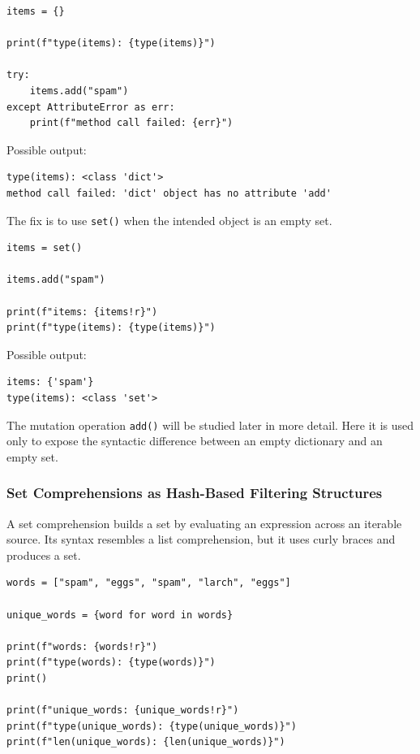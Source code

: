 \begin{verbatim}
items = {}

print(f"type(items): {type(items)}")

try:
    items.add("spam")
except AttributeError as err:
    print(f"method call failed: {err}")
\end{verbatim}

Possible output:

\begin{verbatim}
type(items): <class 'dict'>
method call failed: 'dict' object has no attribute 'add'
\end{verbatim}

The fix is to use \texttt{set()} when the intended object is an empty set.

\begin{verbatim}
items = set()

items.add("spam")

print(f"items: {items!r}")
print(f"type(items): {type(items)}")
\end{verbatim}

Possible output:

\begin{verbatim}
items: {'spam'}
type(items): <class 'set'>
\end{verbatim}

The mutation operation \texttt{add()} will be studied later in more detail. Here it is used only to expose the syntactic difference between an empty dictionary and an empty set.

\subsubsection{Set Comprehensions as Hash-Based Filtering Structures}

A set comprehension builds a set by evaluating an expression across an iterable source. Its syntax resembles a list comprehension, but it uses curly braces and produces a set.

\begin{verbatim}
words = ["spam", "eggs", "spam", "larch", "eggs"]

unique_words = {word for word in words}

print(f"words: {words!r}")
print(f"type(words): {type(words)}")
print()

print(f"unique_words: {unique_words!r}")
print(f"type(unique_words): {type(unique_words)}")
print(f"len(unique_words): {len(unique_words)}")
\end{verbatim}

